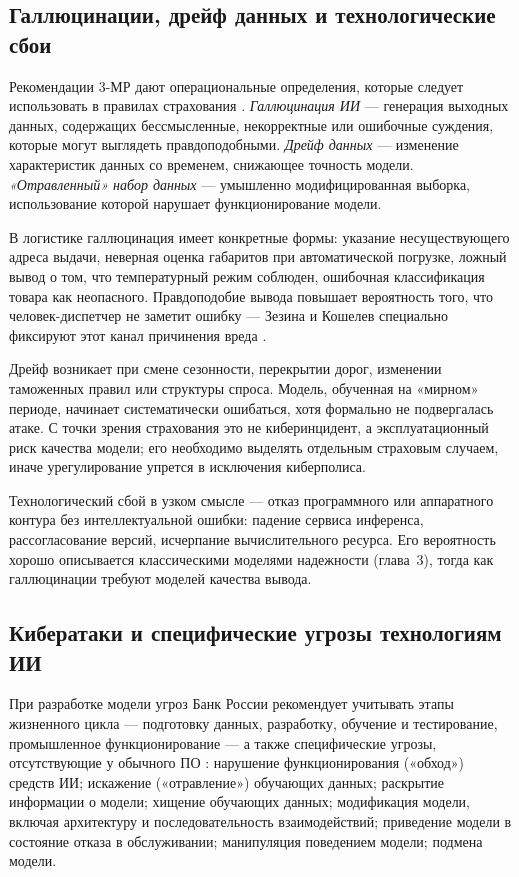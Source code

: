 \documentclass[a4paper,14pt]{extarticle}
\begin{document}
\subsection{Галлюцинации, дрейф данных и технологические сбои}

Рекомендации 3-МР дают операциональные определения, которые следует использовать в правилах страхования \cite{cbr}. \emph{Галлюцинация ИИ} --- генерация выходных данных, содержащих бессмысленные, некорректные или ошибочные суждения, которые могут выглядеть правдоподобными. \emph{Дрейф данных} --- изменение характеристик данных со временем, снижающее точность модели. \emph{«Отравленный» набор данных} --- умышленно модифицированная выборка, использование которой нарушает функционирование модели.

В логистике галлюцинация имеет конкретные формы: указание несуществующего адреса выдачи, неверная оценка габаритов при автоматической погрузке, ложный вывод о том, что температурный режим соблюден, ошибочная классификация товара как неопасного. Правдоподобие вывода повышает вероятность того, что человек-диспетчер не заметит ошибку --- Зезина и Кошелев специально фиксируют этот канал причинения вреда \cite{zezina}.

Дрейф возникает при смене сезонности, перекрытии дорог, изменении таможенных правил или структуры спроса. Модель, обученная на «мирном» периоде, начинает систематически ошибаться, хотя формально не подвергалась атаке. С точки зрения страхования это не киберинцидент, а эксплуатационный риск качества модели; его необходимо выделять отдельным страховым случаем, иначе урегулирование упрется в исключения киберполиса.

Технологический сбой в узком смысле --- отказ программного или аппаратного контура без интеллектуальной ошибки: падение сервиса инференса, рассогласование версий, исчерпание вычислительного ресурса. Его вероятность хорошо описывается классическими моделями надежности (глава~3), тогда как галлюцинации требуют моделей качества вывода.

\subsection{Кибератаки и специфические угрозы технологиям ИИ}

При разработке модели угроз Банк России рекомендует учитывать этапы жизненного цикла --- подготовку данных, разработку, обучение и тестирование, промышленное функционирование --- а также специфические угрозы, отсутствующие у обычного ПО \cite{cbr}:
нарушение функционирования («обход») средств ИИ;
искажение («отравление») обучающих данных;
раскрытие информации о модели;
хищение обучающих данных;
модификация модели, включая архитектуру и последовательность взаимодействий;
приведение модели в состояние отказа в обслуживании;
манипуляция поведением модели;
подмена модели.
\end{document}
